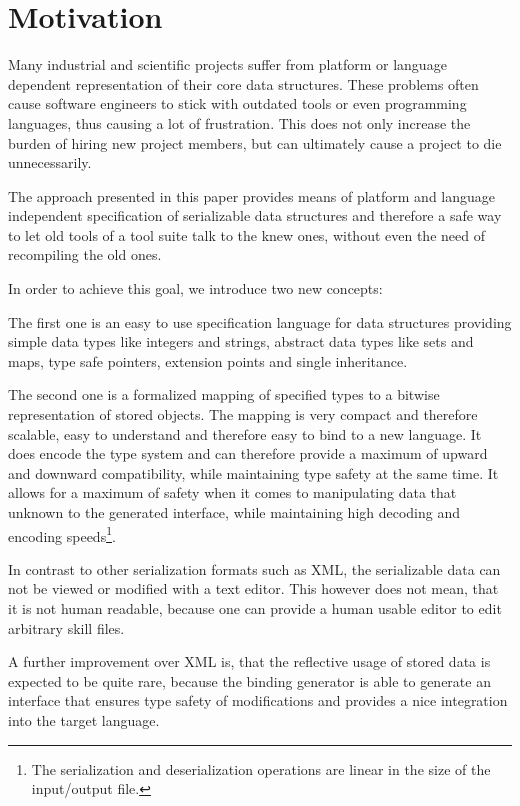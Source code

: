 \section{Motivation}

Many industrial and scientific projects suffer from platform or language dependent representation of their core data structures. These problems often cause software engineers to stick with outdated tools or even programming languages, thus causing a lot of frustration. This does not only increase the burden of hiring new project members, but can ultimately cause a project to die unnecessarily.

The approach presented in this paper provides means of platform and language independent specification of serializable data structures and therefore a safe way to let old tools of a tool suite talk to the knew ones, without even the need of recompiling the old ones.

In order to achieve this goal, we introduce two new concepts:

The first one is an easy to use specification language for data structures providing simple data types like integers and strings, abstract data types like sets and maps, type safe pointers, extension points and single inheritance.

The second one is a formalized mapping of specified types to a bitwise representation of stored objects. The mapping is very compact and therefore scalable, easy to understand and therefore easy to bind to a new language. It does encode the type system and can therefore provide a maximum of upward and downward compatibility, while maintaining type safety at the same time. It allows for a maximum of safety when it comes to manipulating data that unknown to the generated interface, while maintaining high decoding and encoding speeds\footnote{The serialization and deserialization operations are linear in the size of the input/output file.}.

In contrast to other serialization formats such as XML, the serializable data can not be viewed or modified with a text editor. This however does not mean, that it is not human readable, because one can provide a human usable editor to edit arbitrary skill files.

A further improvement over XML is, that the reflective usage of stored data is expected to be quite rare, because the binding generator is able to generate an interface that ensures type safety of modifications and provides a nice integration into the target language.

